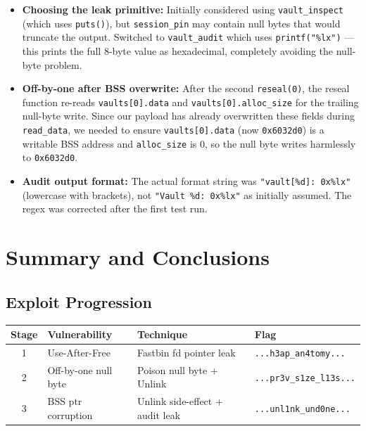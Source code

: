 \documentclass[12pt,a4paper]{article}
\begin{document}
\begin{itemize}
  \item \textbf{Choosing the leak primitive:} Initially considered using
        \texttt{vault\_inspect} (which uses \texttt{puts()}), but
        \texttt{session\_pin} may contain null bytes that would truncate the
        output. Switched to \texttt{vault\_audit} which uses
        \texttt{printf("\%lx")} — this prints the full 8-byte value as
        hexadecimal, completely avoiding the null-byte problem.
  \item \textbf{Off-by-one after BSS overwrite:} After the second
        \texttt{reseal(0)}, the reseal function re-reads \texttt{vaults[0].data}
        and \texttt{vaults[0].alloc\_size} for the trailing null-byte write.
        Since our payload has already overwritten these fields during
        \texttt{read\_data}, we needed to ensure \texttt{vaults[0].data}
        (now \texttt{0x6032d0}) is a writable BSS address and
        \texttt{alloc\_size} is 0, so the null byte writes harmlessly to
        \texttt{0x6032d0}.
  \item \textbf{Audit output format:} The actual format string was
        \texttt{"vault[\%d]: 0x\%lx"} (lowercase with brackets), not
        \texttt{"Vault \%d: 0x\%lx"} as initially assumed. The regex was
        corrected after the first test run.
\end{itemize}

\newpage
\section{Summary and Conclusions}

\subsection{Exploit Progression}

\begin{center}
\begin{tabular}{clll}
\toprule
\textbf{Stage} & \textbf{Vulnerability} & \textbf{Technique} & \textbf{Flag} \\
\midrule
1 & Use-After-Free & Fastbin fd pointer leak & \texttt{...h3ap\_an4tomy...} \\
2 & Off-by-one null byte & Poison null byte + Unlink & \texttt{...pr3v\_s1ze\_l13s...} \\
3 & BSS ptr corruption & Unlink side-effect + audit leak & \texttt{...unl1nk\_und0ne...} \\
\bottomrule
\end{tabular}
\end{center}
\end{document}
